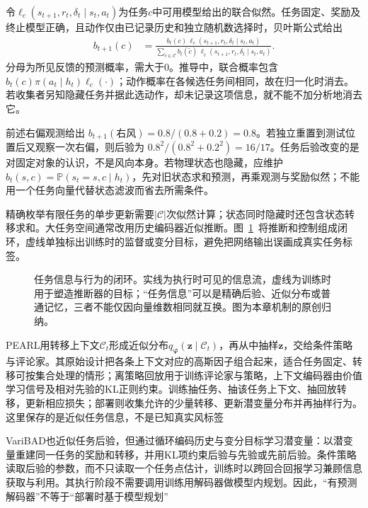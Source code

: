 令$\ell_c(s_{t+1},r_t,\delta_t\mid s_t,a_t)$为任务$c$中可用模型给出的联合似然。任务固定、奖励及终止模型正确，且动作仅由已记录历史和独立随机数选择时，贝叶斯公式给出
\begin{align}
 b_{t+1}(c)
 &=\frac{b_t(c)\,
     \ell_c(s_{t+1},r_t,\delta_t\mid s_t,a_t)}
 {\sum_{\widetilde c\in\mathcal C}b_t(\widetilde c)\,
     \ell_{\widetilde c}(s_{t+1},r_t,\delta_t\mid s_t,a_t)}.
 \label{eq:rl-transfer-belief-update}
\end{align}
分母为所见反馈的预测概率，需大于0。推导中，联合概率包含
$b_t(c)\pi(a_t\mid h_t)\ell_c(\cdot)$；动作概率在各候选任务间相同，故在归一化时消去。若收集者另知隐藏任务并据此选动作，却未记录这项信息，就不能不加分析地消去它。

前述右偏观测给出
$b_{t+1}(\text{右风})=0.8/(0.8+0.2)=0.8$。若独立重置到测试位置后又观察一次右偏，则后验为
$0.8^2/(0.8^2+0.2^2)=16/17$。任务后验改变的是对固定对象的认识，不是风向本身。若物理状态也隐藏，应维护
$b_t(s,c)=\mathbb P(s_t=s,c\mid h_t)$，先对旧状态求和预测，再乘观测与奖励似然；不能用一个任务向量代替状态滤波而省去所需条件。

精确枚举有限任务的单步更新需要$|\mathcal C|$次似然计算；状态同时隐藏时还包含状态转移求和。大任务空间通常改用历史编码器近似推断。图~\ref{fig:rl-transfer-belief-loop}~将推断和控制组成闭环，虚线单独标出训练时的监督或变分目标，避免把网络输出误画成真实任务标签。

\begin{figure}[htbp]
 \centering
 
 \caption{任务信息与行为的闭环。实线为执行时可见的信息流，虚线为训练时用于塑造推断器的目标；“任务信息”可以是精确后验、近似分布或普通记忆，三者不能仅因向量维数相同就互换。图为本章机制的原创归纳。}
 \label{fig:rl-transfer-belief-loop}
\end{figure}

PEARL用转移上下文$\mathcal C_t$形成近似分布$q_{\bm\varphi}(\bm z\mid\mathcal C_t)$，再从中抽样$\bm z$，交给条件策略与评论家。其原始设计把各条上下文对应的高斯因子组合起来，适合任务固定、转移可按集合处理的情形；离策略回放用于训练评论家与策略，上下文编码器由价值学习信号及相对先验的KL正则约束。训练抽任务、抽该任务上下文、抽回放转移，更新相应损失；部署则收集允许的少量转移、更新潜变量分布并再抽样行为。这里保存的是近似任务信息，不是已知真实风标签

VariBAD也近似任务后验，但通过循环编码历史与变分目标学习潜变量：以潜变量重建同一任务的奖励和转移，并用KL项约束后验与先验或先前后验。条件策略读取后验的参数，而不只读取一个任务点估计，训练时以跨回合回报学习兼顾信息获取与利用。其执行阶段不需要调用训练用解码器做模型内规划。因此，“有预测解码器”不等于“部署时基于模型规划”

